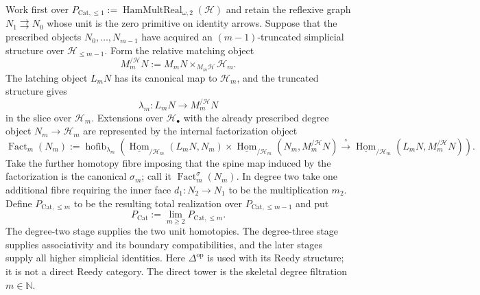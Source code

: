 \begin{construction}
\label{constr:prequantum-fixed-object-reedy-coherence-tower}
Work first over
$P_{\mathrm{Cat},\le1}:=
\operatorname{HamMultReal}_{\omega,2}(\mathcal H)$ and retain the reflexive
graph $N_1\rightrightarrows N_0$ whose unit is the zero primitive on identity
arrows.  Suppose that the prescribed objects $N_0,\ldots,N_{m-1}$ have acquired
an $(m-1)$-truncated simplicial structure over
$\mathcal H_{\le m-1}$.  Form the relative matching object
\[
M_m^{/\mathcal H}N
:=
M_mN\times_{M_m\mathcal H}\mathcal H_m.
\]
The latching object $L_mN$ has its canonical map to $\mathcal H_m$, and the
truncated structure gives
\[
\lambda_m:L_mN\longrightarrow M_m^{/\mathcal H}N
\]
in the slice over $\mathcal H_m$.  Extensions over $\mathcal H_\bullet$ with the
already prescribed degree object $N_m\to\mathcal H_m$ are represented by the
internal factorization object
\[
\boxed{
\operatorname{Fact}_m(N_m)
:=
\operatorname{hofib}_{\lambda_m}
\left(
\underline{\operatorname{Hom}}_{/\mathcal H_m}(L_mN,N_m)
\times
\underline{\operatorname{Hom}}_{/\mathcal H_m}
  (N_m,M_m^{/\mathcal H}N)
\xrightarrow{\ \circ\ }
\underline{\operatorname{Hom}}_{/\mathcal H_m}
  (L_mN,M_m^{/\mathcal H}N)
\right).
}
\]
Take the further homotopy fibre imposing that the spine map induced by the
factorization is the canonical $\sigma_m$; call it
$\operatorname{Fact}_m^{\sigma}(N_m)$.  In degree two take one additional fibre
requiring the inner face $d_1:N_2\to N_1$ to be the multiplication $m_2$.
Define $P_{\mathrm{Cat},\le m}$ to be the resulting total realization over
$P_{\mathrm{Cat},\le m-1}$ and put
\[
\boxed{
P_{\mathrm{Cat}}
:=
\lim_{m\ge2}P_{\mathrm{Cat},\le m}.
}
\]
The degree-two stage supplies the two unit homotopies.  The degree-three stage
supplies associativity and its boundary compatibilities, and the later stages
supply all higher simplicial identities.  Here $\Delta^{\mathrm{op}}$ is used
with its Reedy structure; it is not a direct Reedy category.  The direct tower is
the skeletal degree filtration $m\in\mathbb N$.
\end{construction}

